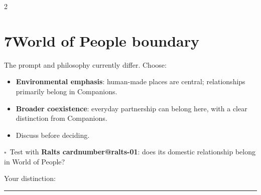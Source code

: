 \documentclass[10pt,a4paper]{article}
\makeatletter
\newcommand{\id}[1]{\csname cardnumber@#1\endcsname}
\newcommand{\boxx}{$\square$}
\newcommand{\blank}{\rule{\linewidth}{0.25pt}}
\makeatother
\begin{document}
\begin{multicols}{2}
\section{7\quad World of People boundary}
The prompt and philosophy currently differ. Choose:
\begin{itemize}
\item \textbf{Environmental emphasis}: human-made places are central; relationships primarily belong in Companions.
\item \textbf{Broader coexistence}: everyday partnership can belong here, with a clear distinction from Companions.
\item Discuss before deciding.
\end{itemize}
\boxx\ Test with \textbf{Ralts \id{ralts-01}}: does its domestic relationship belong in World of People?

Your distinction: \hrulefill\par\blank


\end{multicols}
\end{document}

